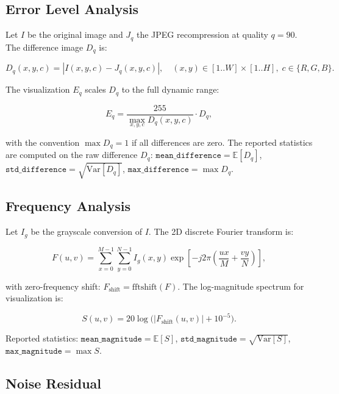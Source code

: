 \documentclass[10pt,conference,compsoc]{IEEEtran}
\begin{document}
\subsection{Error Level Analysis}
\label{sec:math-ela}

Let $I$ be the original image and $J_q$ the JPEG recompression at quality $q=90$.
The difference image $D_q$ is:

\begin{equation}
D_q(x,y,c) = |I(x,y,c) - J_q(x,y,c)|,
\quad (x,y) \in [1..W] \times [1..H], \; c \in \{R,G,B\}.
\label{eq:ela-diff}
\end{equation}

The visualization $E_q$ scales $D_q$ to the full dynamic range:

\begin{equation}
E_q = \frac{255}{\max_{x,y,c} D_q(x,y,c)} \cdot D_q,
\label{eq:ela-scale}
\end{equation}

with the convention $\max D_q = 1$ if all differences are zero.
The reported statistics are computed on the raw difference $D_q$:
$\texttt{mean\_difference} = \mathbb{E}[D_q]$, $\texttt{std\_difference} = \sqrt{\mathrm{Var}[D_q]}$, $\texttt{max\_difference} = \max D_q$.

\subsection{Frequency Analysis}
\label{sec:math-frequency}

Let $I_g$ be the grayscale conversion of $I$.
The 2D discrete Fourier transform is:

\begin{equation}
F(u,v) = \sum_{x=0}^{M-1} \sum_{y=0}^{N-1}
I_g(x,y) \exp\!\left[-j2\pi\left(\frac{ux}{M}+\frac{vy}{N}\right)\right],
\label{eq:fft}
\end{equation}

with zero-frequency shift: $F_{\mathrm{shift}} = \mathrm{fftshift}(F)$.
The log-magnitude spectrum for visualization is:

\begin{equation}
S(u,v) = 20 \log\!\big(|F_{\mathrm{shift}}(u,v)| + 10^{-5}\big).
\label{eq:log-magnitude}
\end{equation}

Reported statistics: $\texttt{mean\_magnitude} = \mathbb{E}[S]$, $\texttt{std\_magnitude} = \sqrt{\mathrm{Var}[S]}$, $\texttt{max\_magnitude} = \max S$.

\subsection{Noise Residual}
\label{sec:math-noise}
\end{document}
